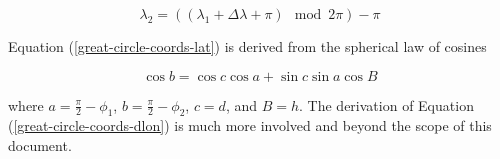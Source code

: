 \documentclass[12pt]{article}
\begin{document}
\begin{equation}
\lambda_2 = \left((\lambda_1+\Delta\lambda+\pi) \mod 2\pi\right)-\pi
\end{equation}

Equation (\ref{great-circle-coords-lat}) is derived from the spherical law of cosines

\begin{equation}
\cos b =\cos c\cos a + \sin c\sin a\cos B
\end{equation}

where $a=\frac{\pi}{2}-\phi_1$, $b=\frac{\pi}{2}-\phi_2$, $c=d$, and $B=h$.  The derivation of Equation (\ref{great-circle-coords-dlon}) is much more involved and beyond the scope of this document.
\end{document}
